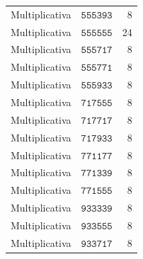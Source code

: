 \begin{table}[!htbp]
\begin{tabular}{@{}llr@{}}
Multiplicativa&\(\mathtt{555393}\)&8\\
Multiplicativa&\(\mathtt{555555}\)&24\\
Multiplicativa&\(\mathtt{555717}\)&8\\
Multiplicativa&\(\mathtt{555771}\)&8\\
Multiplicativa&\(\mathtt{555933}\)&8\\
Multiplicativa&\(\mathtt{717555}\)&8\\
Multiplicativa&\(\mathtt{717717}\)&8\\
Multiplicativa&\(\mathtt{717933}\)&8\\
Multiplicativa&\(\mathtt{771177}\)&8\\
Multiplicativa&\(\mathtt{771339}\)&8\\
Multiplicativa&\(\mathtt{771555}\)&8\\
Multiplicativa&\(\mathtt{933339}\)&8\\
Multiplicativa&\(\mathtt{933555}\)&8\\
Multiplicativa&\(\mathtt{933717}\)&8\\
\bottomrule
\end{tabular}\end{table}

